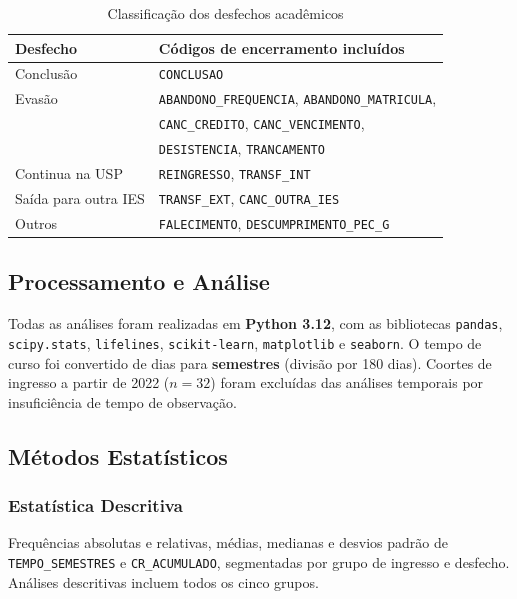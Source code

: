\documentclass[12pt, a4paper]{article}
\begin{document}
\begin{table}[H]
\centering
\caption{Classificação dos desfechos acadêmicos}
\label{tab:desfecho}
\begin{tabular}{@{}ll@{}}
\toprule
\textbf{Desfecho} & \textbf{Códigos de encerramento incluídos} \\
\midrule
Conclusão            & \texttt{CONCLUSAO} \\
Evasão               & \texttt{ABANDONO\_FREQUENCIA}, \texttt{ABANDONO\_MATRICULA}, \\
                     & \texttt{CANC\_CREDITO}, \texttt{CANC\_VENCIMENTO}, \\
                     & \texttt{DESISTENCIA}, \texttt{TRANCAMENTO} \\
Continua na USP      & \texttt{REINGRESSO}, \texttt{TRANSF\_INT} \\
Saída para outra IES & \texttt{TRANSF\_EXT}, \texttt{CANC\_OUTRA\_IES} \\
Outros               & \texttt{FALECIMENTO}, \texttt{DESCUMPRIMENTO\_PEC\_G} \\
\bottomrule
\end{tabular}
\end{table}

\subsection{Processamento e Análise}

Todas as análises foram realizadas em \textbf{Python 3.12}, com as
bibliotecas \texttt{pandas}, \texttt{scipy.stats}, \texttt{lifelines},
\texttt{scikit-learn}, \texttt{matplotlib} e \texttt{seaborn}.
O tempo de curso foi convertido de dias para \textbf{semestres} (divisão
por 180 dias). Coortes de ingresso a partir de 2022 ($n=32$) foram
excluídas das análises temporais por insuficiência de tempo de observação.

\subsection{Métodos Estatísticos}

\subsubsection{Estatística Descritiva}
Frequências absolutas e relativas, médias, medianas e desvios padrão de
\texttt{TEMPO\_SEMESTRES} e \texttt{CR\_ACUMULADO}, segmentadas por grupo
de ingresso e desfecho. Análises descritivas incluem todos os cinco grupos.
\end{document}

